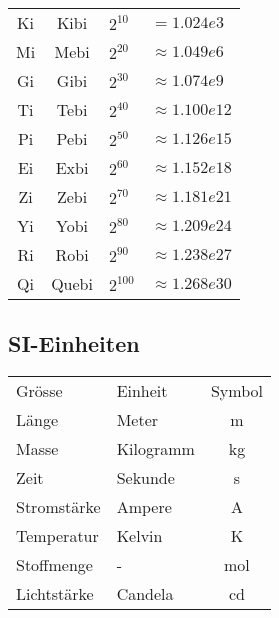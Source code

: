 \begin{sectionbox}
\begin{emphbox}
\begin{tabular}{ccll}
				Ki & Kibi  & $2^{10}$  & $= 1.024e3$ \\
				Mi & Mebi  & $2^{20}$  & $≈ 1.049e6$ \\
				Gi & Gibi  & $2^{30}$  & $≈ 1.074e9$ \\
				Ti & Tebi  & $2^{40}$  & $≈ 1.100e12$ \\
				Pi & Pebi  & $2^{50}$  & $≈ 1.126e15$ \\
				Ei & Exbi  & $2^{60}$  & $≈ 1.152e18$ \\
				Zi & Zebi  & $2^{70}$  & $≈ 1.181e21$ \\
				Yi & Yobi  & $2^{80}$  & $≈ 1.209e24$ \\
				Ri & Robi  & $2^{90}$  & $≈ 1.238e27$ \\
				Qi & Quebi & $2^{100}$ & $≈ 1.268e30$ \\

			\end{tabular}
		\end{emphbox}
	
	\subsection{SI-Einheiten}
		\begin{emphbox}
			\begin{tabular}{llc}
				Grösse & Einheit & Symbol \\
				Länge & Meter & m \\
				Masse & Kilogramm & kg \\
				Zeit & Sekunde & s \\
				Stromstärke & Ampere & A \\
				Temperatur & Kelvin & K \\
				Stoffmenge & - & mol \\
				Lichtstärke & Candela & cd			
		\end{tabular}
	\end{emphbox}
	
	

\end{sectionbox}
